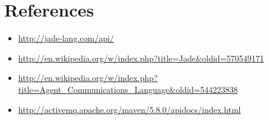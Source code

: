 \documentclass{article}
\begin{document}
\section{References}
\begin{itemize}
\item \url{http://jade-lang.com/api/}
\item \url{http://en.wikipedia.org/w/index.php?title=Jade&oldid=570549171}
\item \url{http://en.wikipedia.org/w/index.php?title=Agent\_Communications\_Language&oldid=544223838}
\item \url{http://activemq.apache.org/maven/5.8.0/apidocs/index.html}
\end{itemize}
\end{document}
